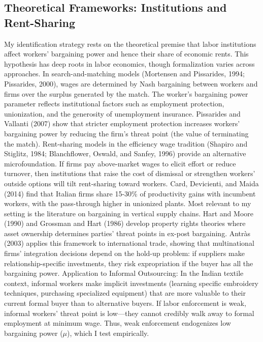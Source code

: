 \subsection{Theoretical Frameworks: Institutions and Rent-Sharing}
My identification strategy rests on the theoretical premise that labor institutions affect workers' bargaining power and hence their share of economic rents. This hypothesis has deep roots in labor economics, though formalization varies across approaches.
In search-and-matching models (Mortensen and Pissarides, 1994; Pissarides, 2000), wages are determined by Nash bargaining between workers and firms over the surplus generated by the match. The worker's bargaining power parameter reflects institutional factors such as employment protection, unionization, and the generosity of unemployment insurance. Pissarides and Vallanti (2007) show that stricter employment protection increases workers' bargaining power by reducing the firm's threat point (the value of terminating the match).
Rent-sharing models in the efficiency wage tradition (Shapiro and Stiglitz, 1984; Blanchflower, Oswald, and Sanfey, 1996) provide an alternative microfoundation. If firms pay above-market wages to elicit effort or reduce turnover, then institutions that raise the cost of dismissal or strengthen workers' outside options will tilt rent-sharing toward workers. Card, Devicienti, and Maida (2014) find that Italian firms share 15-30\% of productivity gains with incumbent workers, with the pass-through higher in unionized plants.
Most relevant to my setting is the literature on bargaining in vertical supply chains. Hart and Moore (1990) and Grossman and Hart (1986) develop property rights theories where asset ownership determines parties' threat points in ex-post bargaining. Antràs (2003) applies this framework to international trade, showing that multinational firms' integration decisions depend on the hold-up problem: if suppliers make relationship-specific investments, they risk expropriation if the buyer has all the bargaining power.
Application to Informal Outsourcing: In the Indian textile context, informal workers make implicit investments (learning specific embroidery techniques, purchasing specialized equipment) that are more valuable to their current formal buyer than to alternative buyers. If labor enforcement is weak, informal workers' threat point is low—they cannot credibly walk away to formal employment at minimum wage. Thus, weak enforcement endogenizes low bargaining power ($\mu$), which I test empirically.
